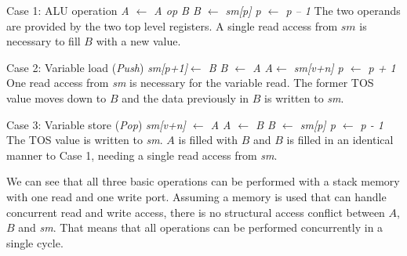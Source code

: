 \begin{description}
\begin{samepage}
\item[Case 1:]
ALU operation \newline \textit{A $\leftarrow $ A op B
\newline B $\leftarrow $ sm[p] \newline p $\leftarrow $ p -- 1
\newline }The two operands are provided by the two top level
registers. A single read access from $sm$ is necessary to fill $B$
with a new value.
\end{samepage}
%
\begin{samepage}
\item[Case 2:]
    Variable load (\textit{Push}) \newline
    \textit{
    sm[p+1]$\leftarrow $ B \newline
    B $\leftarrow $ A \newline
    A$\leftarrow $ sm[v+n] \newline
    p $\leftarrow $ p + 1 \newline
    }
    One read access from \textit{sm} is necessary for the variable read. The
former TOS value moves down to $B$ and the data previously in $B$ is
written to \textit{sm}.
\end{samepage}
%
\begin{samepage}
\item[Case 3:]
    Variable store (\textit{Pop}) \newline
    \textit{sm[v+n] $\leftarrow $ A \newline
    A $\leftarrow $ B \newline
    B $\leftarrow $ sm[p] \newline
    p $\leftarrow $ p - 1 \newline }
    The TOS value is written to \textit{sm}. $A$ is filled with $B$ and $B$ is filled in an
identical manner to Case 1, needing a single read access from
\textit{sm}.
\end{samepage}
\end{description}
%
We can see that all three basic operations can be performed with a
stack memory with one read and one write port. Assuming a memory is
used that can handle concurrent read and write access, there is no
structural access conflict between $A$, $B$ and \textit{sm}. That
means that all operations can be performed concurrently in a single
cycle.

